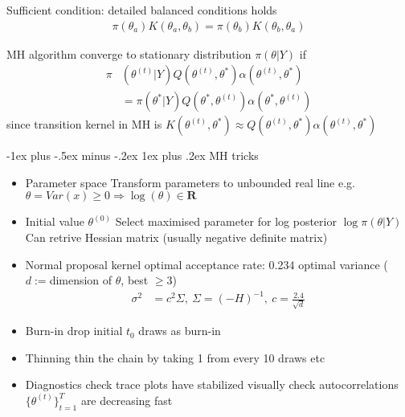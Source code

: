 \documentclass[a4paper,12pt,landscape]{article}
\makeatletter
\renewcommand{\subsubsection}{\@startsection{subsubsection}{3}{0mm}%
                                {-1ex plus -.5ex minus -.2ex}%
                                {1ex plus .2ex}%
                                {\normalfont\small\bfseries\color{violet}}}
\makeatother
\begin{document}
\begin{multicols}{3}
Sufficient condition: detailed balanced conditions holds
\begin{align*}
    \pi(\theta_a) K(\theta_a, \theta_b) = \pi(\theta_b)K(\theta_b,
    \theta_a)
\end{align*}

MH algorithm converge to stationary distribution $\pi(\theta|Y)$ if
\begin{align*}
    \pi&(\theta^{(t)}|Y) Q(\theta^{(t)}, \theta^*)\alpha(\theta^{(t)},
    \theta^*)\\
                       &= \pi(\theta^*|Y)Q(\theta^*,
                       \theta^{(t)})\alpha(\theta^*, \theta^{(t)})
\end{align*}
since transition kernel in MH is $K(\theta^{(t)}, \theta^*)\approx
Q(\theta^{(t)}, \theta^*)\alpha(\theta^{(t)}, \theta^*)$

\subsubsection{MH tricks}

\begin{itemize}
    \item Parameter space
        \subitem Transform parameters to unbounded real line
        \subitem e.g. $\theta = Var(x) \geq 0 \Rightarrow \log(\theta)\in
            \boldsymbol{R}$
    \item Initial value $\theta^{(0)}$
        \subitem Select maximised parameter for log posterior $\log\pi(\theta|Y)$
        \subitem Can retrive Hessian matrix (usually negative definite
        matrix)
    \item Normal proposal kernel
        \subitem optimal acceptance rate: 0.234
        \subitem optimal variance ($d:=$dimension of $\theta$, best
        $\geq 3$)
        \begin{align*}
            \sigma^2 &= c^2\Sigma,
            ~\Sigma = (-H)^{-1}, ~c = \frac{2.4}{\sqrt{d}}
        \end{align*}
    \item Burn-in
        \subitem drop initial $t_0$ draws as burn-in
    \item Thinning
        \subitem thin the chain by taking 1 from every 10 draws etc
    \item Diagnostics
        \subitem check trace plots have stabilized visually
        \subitem check autocorrelations $\{\theta^{(t)}\}_{t=1}^T$ are
        decreasing fast
\end{itemize}


\end{multicols}
\end{document}
